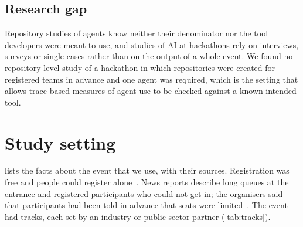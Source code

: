 \documentclass{article}
\begin{document}
\subsection{Research gap}
Repository studies of agents know neither their denominator nor the tool developers were meant to use, and studies of AI at hackathons rely on interviews, surveys or single cases rather than on the output of a whole event. We found no repository-level study of a hackathon in which repositories were created for registered teams in advance and one agent was required, which is the setting that allows trace-based measures of agent use to be checked against a known intended tool.

\section{Study setting}\label{sec:event}

 lists the facts about the event that we use, with their sources. Registration was free and people could register alone~\cite{hackalem2026site}. News reports describe long queues at the entrance and registered participants who could not get in; the organisers said that participants had been told in advance that seats were limited~\cite{qumash2026queue,ulys2026survival}. The event had \NTracksCount{} tracks, each set by an industry or public-sector partner (\cref{tab:tracks}).
\end{document}

